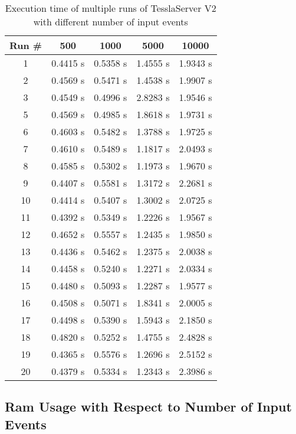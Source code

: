\begin{table}[!htb]
  \centering
  \caption{Execution time of multiple runs of TesslaServer V2 with different number of input events}
  \label{table:tessla_server_v2_events_num_events_data}
  \begin{tabular}{cllll}
    Run \# & \multicolumn{1}{c}{500} & \multicolumn{1}{c}{1000} & \multicolumn{1}{c}{5000} & \multicolumn{1}{c}{10000} \\ \hline
    1 &  0.4415 s & 0.5358 s & 1.4555 s & 1.9343 s \\
    2 &  0.4569 s & 0.5471 s & 1.4538 s & 1.9907 s \\
    3 &  0.4549 s & 0.4996 s & 2.8283 s & 1.9546 s \\
    5 &  0.4569 s & 0.4985 s & 1.8618 s & 1.9731 s \\
    6 &  0.4603 s & 0.5482 s & 1.3788 s & 1.9725 s \\
    7 &  0.4610 s & 0.5489 s & 1.1817 s & 2.0493 s \\
    8 &  0.4585 s & 0.5302 s & 1.1973 s & 1.9670 s \\
    9 &  0.4407 s & 0.5581 s & 1.3172 s & 2.2681 s \\
    10 & 0.4414 s & 0.5407 s & 1.3002 s & 2.0725 s \\
    11 & 0.4392 s & 0.5349 s & 1.2226 s & 1.9567 s \\
    12 & 0.4652 s & 0.5557 s & 1.2435 s & 1.9850 s \\
    13 & 0.4436 s & 0.5462 s & 1.2375 s & 2.0038 s \\
    14 & 0.4458 s & 0.5240 s & 1.2271 s & 2.0334 s \\
    15 & 0.4480 s & 0.5093 s & 1.2287 s & 1.9577 s \\
    16 & 0.4508 s & 0.5071 s & 1.8341 s & 2.0005 s \\
    17 & 0.4498 s & 0.5390 s & 1.5943 s & 2.1850 s \\
    18 & 0.4820 s & 0.5252 s & 1.4755 s & 2.4828 s \\
    19 & 0.4365 s & 0.5576 s & 1.2696 s & 2.5152 s \\
    20 & 0.4379 s & 0.5334 s & 1.2343 s & 2.3986 s \\
  \end{tabular}
\end{table}

\clearpage

\subsection{Ram Usage with Respect to Number of Input Events}
\label{sec:appendix:runtime_benchmark_data:ram_usage_events}

